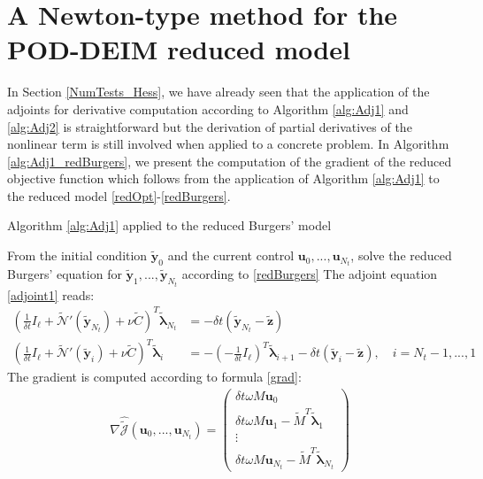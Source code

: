\section{A Newton-type method for the POD-DEIM reduced model}
\label{Newton_red_chapter}
In Section \ref{NumTests_Hess}, we have already seen that the application of the adjoints for derivative computation according to Algorithm \eqref{alg:Adj1} and \eqref{alg:Adj2} is straightforward but the derivation of partial derivatives of the nonlinear term is still involved when applied to a concrete problem. In Algorithm \ref{alg:Adj1_redBurgers}, we present the computation of the gradient of the reduced objective function which follows from the application of Algorithm \ref{alg:Adj1} to the reduced model \eqref{redOpt}-\eqref{redBurgers}.
\begin{algorithm}[H]
\caption{Algorithm \ref{alg:Adj1} applied to the reduced Burgers' model}
\label{alg:Adj1_redBurgers}
\begin{algorithmic}[1]
\STATE From the initial condition $\mathbf{\tilde y}_0$ and the current control $\mathbf{u}_0,...,\mathbf{u}_{N_t}$, solve the reduced Burgers' equation for $\mathbf{\tilde y}_1,...,\mathbf{\tilde y}_{N_t}$ according to \ref{redBurgers}
\STATE The adjoint equation \eqref{adjoint1} reads:
\begin{subequations}
\begin{align}
\label{AdjRedOrder_term}
\left(\frac{1}{\delta \! t}I_\ell + \tilde{\mathcal{N}}'(\mathbf{\tilde{y}}_{N_t})  +  \nu \tilde{C}\right)^T \boldsymbol{\tilde{\lambda}}_{N_t} &= -\delta \! t(\mathbf{\tilde{y}}_{N_t} - \mathbf{\tilde z} )\\
\label{AdjRedOrder}
\left(\frac{1}{\delta \! t}I_\ell + \tilde{\mathcal{N}}'(\mathbf{\tilde{y}}_{i})  + \nu \tilde{C}\right)^T \boldsymbol{\tilde{\lambda}}_i &= - (-\frac{1}{\delta \! t} I_\ell)^T \boldsymbol{\tilde{\lambda}}_{i+1} -\delta \! t( \mathbf{\tilde{y}}_{i} - \mathbf{\tilde z} ), \quad i = N_t-1,...,1
\end{align}
\end{subequations}
\STATE The gradient is computed according to formula \eqref{grad}:
\begin{align}
\label{gradRedOrder}
\nabla \hat{\tilde{\mathcal J}}(\mathbf{u}_0,...,\mathbf{u}_{N_t}) = \begin{pmatrix} \delta \! t \omega M \mathbf{u}_0 \\ \delta \! t \omega M \mathbf{u}_1 - \tilde{M}^T \boldsymbol{\tilde{\lambda}}_1 \\ \vdots \\ \delta \! t \omega M \mathbf{u}_{N_t} - \tilde{M}^T \boldsymbol{\tilde{\lambda}}_{N_t} \end{pmatrix}
\end{align}
\end{algorithmic}
\end{algorithm}
